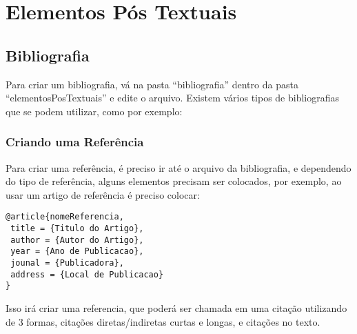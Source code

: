 \chapter{Elementos Pós Textuais}
\section{Bibliografia}

Para criar um bibliografia, vá na pasta ``bibliografia'' dentro da pasta ``elementosPosTextuais'' e edite o arquivo. Existem vários tipos de bibliografias que se podem utilizar, como por exemplo:

\begin{table}[htb]
\end{table}

\subsection{Criando uma Referência}
Para criar uma referência, é preciso ir até o arquivo da bibliografia, e dependendo do tipo de referência, alguns elementos precisam ser colocados, por exemplo, ao usar um artigo de referência é preciso colocar:
\begin{lstlisting}
@article{nomeReferencia,
 title = {Titulo do Artigo},
 author = {Autor do Artigo},
 year = {Ano de Publicacao},
 jounal = {Publicadora},
 address = {Local de Publicacao}
}
\end{lstlisting}

Isso irá criar uma referencia, que poderá ser chamada em uma citação utilizando de 3 formas, citações diretas/indiretas curtas e longas, e  citações no texto.

